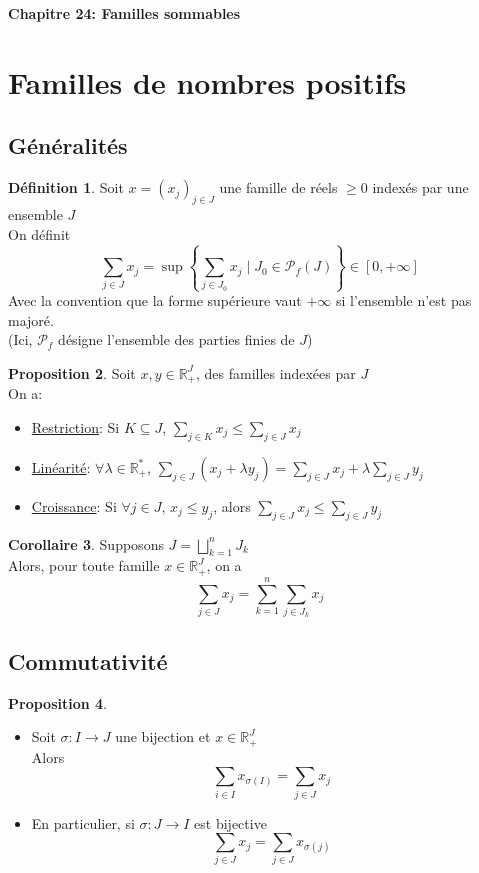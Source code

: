 \documentclass[10pt,a4paper]{article}
\theoremstyle{definition}
\newtheorem{proposition}{Proposition}[section]
\newtheorem{corollaire}[proposition]{Corollaire}
\newtheorem{definition}[proposition]{Définition}
\begin{document}
\renewcommand{\labelitemi}{$*$}
\begin{center}
{\Large \textbf{Chapitre 24: Familles sommables}}
\end{center}
\section{Familles de nombres positifs}
\subsection{Généralités}
\begin{definition}
Soit $x = (x_j)_{j \in J}$ une famille de réels $\geq 0$ indexés par une ensemble $J$ \\
On définit
\[\sum\limits_{j \in J} x_j = \sup \left\{ \sum\limits_{j \in J_0} x_j \mid J_0 \in \mathcal{P}_f(J) \right\} \in [0, +\infty]\]
Avec la convention que la forme supérieure vaut $+\infty$ si l'ensemble n'est pas majoré. \\
(Ici, $\mathcal{P}_f$ désigne l'ensemble des parties finies de $J$)
\end{definition}
\begin{proposition}
Soit $x, y \in \mathbb{R}_+^J$, des familles indexées par $J$ \\
On a:
\begin{itemize}
\item \uline{Restriction}: Si $K \subseteq J$, $\sum\limits_{j \in K} x_j \leq \sum\limits_{j \in J} x_j$
\item \uline{Linéarité}: $\forall \lambda \in \mathbb{R}_+^*$, $\sum\limits_{j \in J} (x_j + \lambda y_j) = \sum\limits_{j \in J} x_j + \lambda \sum\limits_{j \in J} y_j$
\item \uline{Croissance}: Si $\forall j \in J$, $x_j \leq y_j$, alors $\sum\limits_{j \in J} x_j \leq \sum\limits_{j \in J} y_j$
\end{itemize}
\end{proposition}
\begin{corollaire}
Supposons $J = \bigsqcup\limits_{k = 1}^n J_k$ \\
Alors, pour toute famille $x \in \mathbb{R}_+^J$, on a 
\[\sum\limits_{j \in J} x_j = \sum\limits_{k = 1}^n \sum\limits_{j \in J_k} x_j\]
\end{corollaire}

\subsection{Commutativité}
\begin{proposition}
\hfill
\begin{itemize}
\item Soit $\sigma: I \to J$ une bijection et $x \in \mathbb{R}_+^J$ \\
Alors 
\[\sum\limits_{i \in I} x_{\sigma(I)} = \sum\limits_{j \in J} x_j\]
\item En particulier, si $\sigma: J \to I$ est bijective
\[\sum\limits_{j \in J} x_j = \sum\limits_{j \in J} x_{\sigma(j)}\]
\end{itemize}
\end{proposition}
\end{document}
